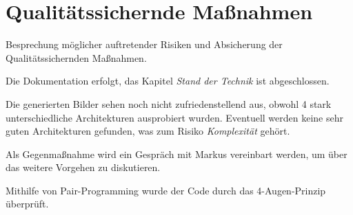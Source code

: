\section{Qualitätssichernde Maßnahmen}
Besprechung möglicher auftretender Risiken und Absicherung der Qualitätssichernden Maßnahmen.
\begin{description}[style=nextline]
	\item[Review und Dokumentation \hfill \fullcheck]
	Die Dokumentation erfolgt, das Kapitel \textit{Stand der Technik} ist abgeschlossen.
	
	\item[Risikoanalyse \hfill \fullcheck]
	Die generierten Bilder sehen noch nicht zufriedenstellend aus, obwohl 4 stark unterschiedliche Architekturen ausprobiert wurden.
	Eventuell werden keine sehr guten Architekturen gefunden, was zum Risiko \textit{Komplexität} gehört.
	
	Als Gegenmaßnahme wird ein Gespräch mit Markus vereinbart werden, um über das weitere Vorgehen zu diskutieren.
	
	\item[Pair-Programming \hfill \fullcheck]
	Mithilfe von Pair-Programming wurde der Code durch das 4-Augen-Prinzip überprüft.
	
	
\end{description}

